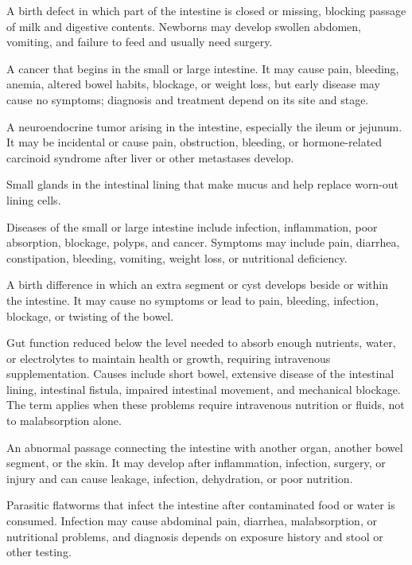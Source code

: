 A birth defect in which part of the intestine is closed or missing, blocking passage of milk and digestive contents. Newborns may develop swollen abdomen, vomiting, and failure to feed and usually need surgery.

 A cancer that begins in the small or large intestine. It may cause pain, bleeding, anemia, altered bowel habits, blockage, or weight loss, but early disease may cause no symptoms; diagnosis and treatment depend on its site and stage.

 A neuroendocrine tumor arising in the intestine, especially the ileum or jejunum. It may be incidental or cause pain, obstruction, bleeding, or hormone-related carcinoid syndrome after liver or other metastases develop.

 Small glands in the intestinal lining that make mucus and help replace worn-out lining cells.

 Diseases of the small or large intestine include infection, inflammation, poor absorption, blockage, polyps, and cancer. Symptoms may include pain, diarrhea, constipation, bleeding, vomiting, weight loss, or nutritional deficiency.

 A birth difference in which an extra segment or cyst develops beside or within the intestine. It may cause no symptoms or lead to pain, bleeding, infection, blockage, or twisting of the bowel.

 Gut function reduced below the level needed to absorb enough nutrients, water, or
electrolytes to maintain health or growth, requiring intravenous supplementation. Causes include short bowel,
extensive disease of the intestinal lining, intestinal fistula, impaired intestinal movement, and mechanical
blockage. The term applies when these problems require intravenous nutrition or fluids, not to malabsorption alone.

 An abnormal passage connecting the intestine with another organ, another bowel segment, or the skin. It may develop after inflammation, infection, surgery, or injury and can cause leakage, infection, dehydration, or poor nutrition.

 Parasitic flatworms that infect the intestine after contaminated food or water is consumed. Infection may cause abdominal pain, diarrhea, malabsorption, or nutritional problems, and diagnosis depends on exposure history and stool or other testing.

